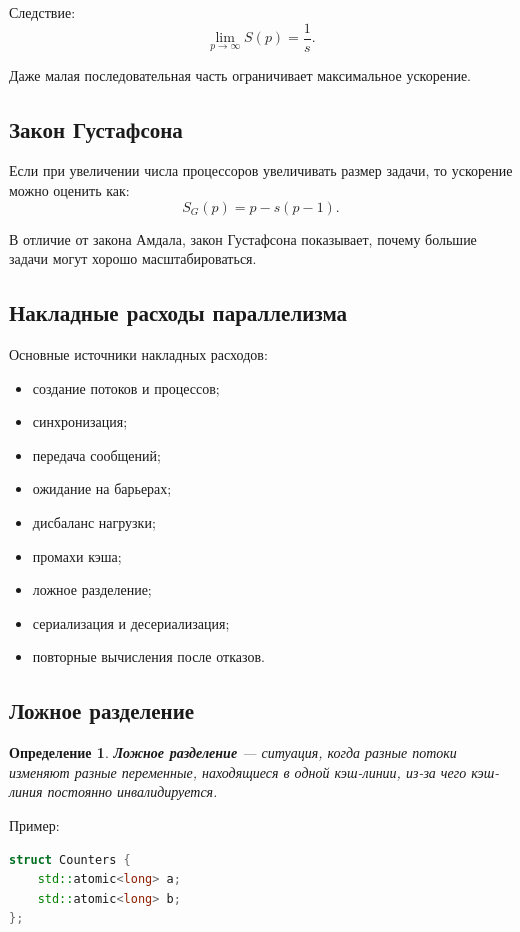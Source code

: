 \documentclass[12pt,a4paper]{article}
\newtheorem{definition}{Определение}
\begin{document}
Следствие:
\[
\lim_{p \to \infty} S(p) = \frac{1}{s}.
\]

Даже малая последовательная часть ограничивает максимальное ускорение.

\subsection{Закон Густафсона}

Если при увеличении числа процессоров увеличивать размер задачи, то ускорение можно оценить как:
\[
S_G(p) = p - s(p-1).
\]

В отличие от закона Амдала, закон Густафсона показывает, почему большие задачи могут хорошо масштабироваться.

\subsection{Накладные расходы параллелизма}

Основные источники накладных расходов:
\begin{itemize}
    \item создание потоков и процессов;
    \item синхронизация;
    \item передача сообщений;
    \item ожидание на барьерах;
    \item дисбаланс нагрузки;
    \item промахи кэша;
    \item ложное разделение;
    \item сериализация и десериализация;
    \item повторные вычисления после отказов.
\end{itemize}

\subsection{Ложное разделение}

\begin{definition}
\textbf{Ложное разделение} --- ситуация, когда разные потоки изменяют разные переменные, находящиеся в одной кэш-линии, из-за чего кэш-линия постоянно инвалидируется.
\end{definition}

Пример:

\begin{lstlisting}[language=C++]
struct Counters {
    std::atomic<long> a;
    std::atomic<long> b;
};
\end{lstlisting}
\end{document}
